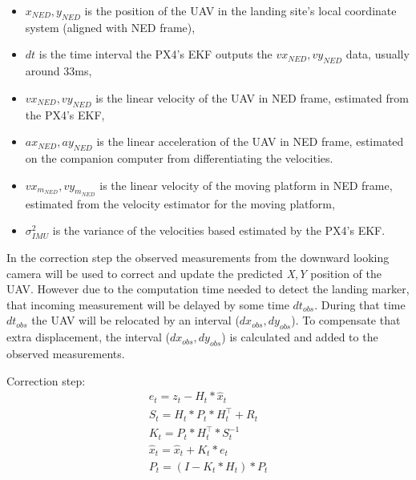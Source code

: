 \documentclass[conference]{IEEEtran}
\begin{document}
\begin{itemize}
\item  \(x_{NED}, y_{NED} \) is the position of the UAV in the landing site's local coordinate system (aligned with NED frame), 
\item \(dt\) is the time interval the PX4's EKF outputs the \(vx_{NED},vy_{NED}\) data, usually around 33ms, 
\item \(vx_{NED},vy_{NED}\) is the linear velocity of the UAV in NED frame, estimated from the PX4's EKF,


\item \(ax_{NED}, ay_{NED}\) is the linear acceleration of the UAV in NED frame, estimated on the companion computer from differentiating the velocities.


\item \(vx_{m_{NED}},vy_{m_{NED}}\) is the linear velocity of the moving platform in NED frame, estimated from the velocity estimator for the moving platform,


\item \(\sigma^{2}_{IMU}\) is the variance of the velocities based estimated by the PX4's EKF.
\end{itemize}

In the correction step the observed measurements from the downward
looking camera will be used to correct and update the predicted
\emph{X,Y} position of the UAV. However due to the computation time
needed to detect the landing marker, that incoming measurement will be
delayed by some time \(dt_{obs}\). During that time \(dt_{obs}\) the
UAV will be relocated by an interval (\(dx_{obs},dy_{obs}\)). To
compensate that extra displacement, the interval
(\(dx_{obs},dy_{obs}\)) is calculated and added to the observed
measurements.

Correction step:
\begin{equation}
    \begin{array}{l}
    
    e_{t} = z_{t} - H_{t}*\hat{x}_{t} \\
    S_{t} = H_{t}*P_{t}*H_{t}^\top + R_{t} \\
    K_{t} = P_{t}*H_{t}^\top * S_{t}^{-1} \\
    \hat{x}_{t} = \hat{x}_{t} + K_{t} * e_{t} \\
    P_{t} = (I - K_{t}*H_{t}) * P_{t}
    \end{array}
\end{equation}
\end{document}
